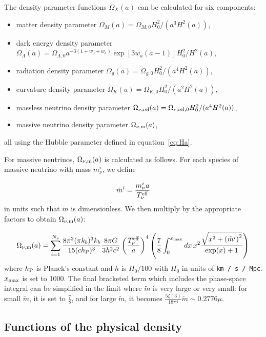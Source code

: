 \documentclass[\docopts]{\docclass}
\begin{document}
The density parameter functions $\Omega_X(a)$ can be calculated for six components:
\begin{itemize}
\item matter density parameter $\Omega_M(a) = \Omega_{M,0} H_0^2 / (a^3 H^2(a) )$,
\item dark energy density parameter $\Omega_\Lambda(a) = \Omega_{\Lambda,0} a^{-3(1+w_0+w_a)} \exp[3 w_a (a-1)] H_0^2 / H^2(a)$,
\item radiation density parameter $\Omega_g(a) = \Omega_{g,0} H_0^2 / (a^4 H^2(a) )$,
\item curvature density parameter $\Omega_K(a) = \Omega_{K,0} H_0^2 / (a^2 H^2(a) )$,
\item massless neutrino density parameter $\Omega_{\nu, {\rm rel}}(a) = \Omega_{\nu, {\rm rel},0} H_0^2 / (a^4 H^2(a) )$,
\item massive neutrino density parameter $\Omega_{\nu, {\rm m}}(a)$,
\end{itemize}
all using the Hubble parameter defined in equation~\ref{eq:Ha}.

For massive neutrinos, $\Omega_{\nu, {\rm m}}(a)$ is calculated as follows.
For each species of massive neutrino with mass $m_\nu^i$, we define

\begin{equation}
\tilde{m}^i = \frac{m_{\nu}^{i}a}{T_{\nu}^{\rm eff}}
\label{mnuOT}
\end{equation}
in units such that $\tilde{m}$ is dimensionless. We then multiply by the appropriate
factors to obtain $\Omega_{\nu, {\rm m}}(a)$:

\begin{equation}
\Omega_{\nu, {\rm m}}(a) = \sum_{i=1}^{N_\nu} \frac{8 \pi^2(\pi k_b )^3 k_b}{15(c h_{\rm P})^3} \frac{8 \pi G}{3h^2c^2}
\left(\frac{T_{\nu}^{\rm eff}}{a}\right)^4 \left(\frac{7}{8}\int_0^{x_{\rm max}} dx \, x^2
\frac{\sqrt{x^2 + \left(\tilde{m}^i\right)^2}}{\exp(x) + 1}\right)
\label{Omnu}
\end{equation}
where $h_{\rm P}$ is Planck's constant and $h$ is $H_0/100$ with $H_0$ in units
of {\tt km / s / Mpc}. $x_{\rm max}$ is set to 1000. The final bracketed term
which includes the phase-space integral can be simplified in the limit where
$\tilde{m}$ is very large or very small: for small $\tilde{m}$, it is set to
$\frac{7}{8}$, and for large $\tilde{m}$, it becomes
$\frac{5\zeta(3)}{18\pi^4}\tilde{m}\sim 0.2776\mu$.

\subsection{Functions of the physical density}
\label{subsec:physicaldensity}
\end{document}
